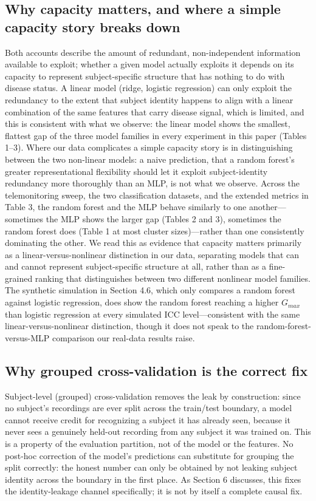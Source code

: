 \documentclass[11pt]{article}
\begin{document}
\subsection{Why capacity matters, and where a simple capacity story breaks down}
Both accounts describe the amount of redundant, non-independent information available to exploit; whether a given model actually exploits it depends on its capacity to represent subject-specific structure that has nothing to do with disease status. A linear model (ridge, logistic regression) can only exploit the redundancy to the extent that subject identity happens to align with a linear combination of the same features that carry disease signal, which is limited, and this is consistent with what we observe: the linear model shows the smallest, flattest gap of the three model families in every experiment in this paper (Tables 1--3). Where our data complicates a simple capacity story is in distinguishing between the two non-linear models: a naive prediction, that a random forest's greater representational flexibility should let it exploit subject-identity redundancy more thoroughly than an MLP, is not what we observe. Across the telemonitoring sweep, the two classification datasets, and the extended metrics in Table 3, the random forest and the MLP behave similarly to one another---sometimes the MLP shows the larger gap (Tables 2 and 3), sometimes the random forest does (Table 1 at most cluster sizes)---rather than one consistently dominating the other. We read this as evidence that capacity matters primarily as a linear-versus-nonlinear distinction in our data, separating models that can and cannot represent subject-specific structure at all, rather than as a fine-grained ranking that distinguishes between two different nonlinear model families. The synthetic simulation in Section 4.6, which only compares a random forest against logistic regression, does show the random forest reaching a higher $G_{max}$ than logistic regression at every simulated ICC level---consistent with the same linear-versus-nonlinear distinction, though it does not speak to the random-forest-versus-MLP comparison our real-data results raise.

\subsection{Why grouped cross-validation is the correct fix}
Subject-level (grouped) cross-validation removes the leak by construction: since no subject's recordings are ever split across the train/test boundary, a model cannot receive credit for recognizing a subject it has already seen, because it never sees a genuinely held-out recording from any subject it was trained on. This is a property of the evaluation partition, not of the model or the features. No post-hoc correction of the model's predictions can substitute for grouping the split correctly: the honest number can only be obtained by not leaking subject identity across the boundary in the first place. As Section 6 discusses, this fixes the identity-leakage channel specifically; it is not by itself a complete causal fix.
\end{document}

